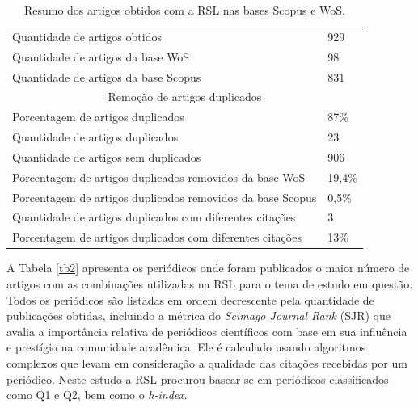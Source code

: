 \begin{table}[!htb]
	\centering
	\caption{Resumo dos artigos obtidos com a RSL nas bases Scopus e WoS.}
	\label{tab:resumo}
	\begin{tabular}{ll}
		\hline
		Quantidade de artigos obtidos & 929 \\
		Quantidade de artigos da base WoS & 98 \\
		Quantidade de artigos da base Scopus & 831 \\
		\hline
		\multicolumn{2}{c}{Remoção de artigos duplicados} \\
		\hline
		Porcentagem de artigos duplicados & 87\% \\
		Quantidade de artigos duplicados & 23 \\
		Quantidade de artigos sem duplicados & 906 \\
		Porcentagem de artigos duplicados removidos da base WoS & 19,4\% \\
		Porcentagem de artigos duplicados removidos da base Scopus & 0,5\% \\
		Quantidade de artigos duplicados com diferentes citações & 3 \\
		Porcentagem de artigos duplicados com diferentes citações & 13\% \\
		\hline
	\end{tabular}
	
\end{table}


A Tabela \ref{tb2} apresenta os periódicos onde foram publicados o maior número de artigos com as combinações utilizadas na RSL para o tema de estudo em questão. Todos os periódicos são listadas em ordem decrescente pela quantidade de publicações obtidas, incluindo a métrica do \textit{Scimago Journal Rank} (SJR) que avalia a importância relativa de periódicos científicos com base em sua influência e prestígio na comunidade acadêmica. Ele é calculado usando algoritmos complexos que levam em consideração a qualidade das citações recebidas por um periódico. Neste estudo a RSL procurou basear-se em periódicos classificados como Q1 e Q2, bem como o \textit{h-index}.

